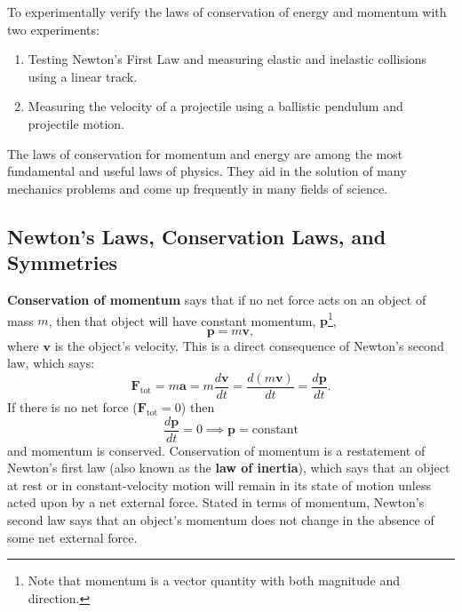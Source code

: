 \documentclass[addpoints]{physlabs}
\begin{document}
\begin{labsection}
\begin{objective}
    To experimentally verify the laws of conservation of energy and momentum with two experiments:
    \begin{enumerate}[itemsep=-0.1em]
        \item Testing Newton's First Law and measuring elastic and inelastic collisions using a linear track.
        \item Measuring the velocity of a projectile using a ballistic pendulum and projectile motion.
    \end{enumerate}
\end{objective}

\begin{theory}
    The laws of conservation for momentum and energy are among the most fundamental and useful laws of physics. 
    They aid in the solution of many mechanics problems and come up frequently in many fields of science.

    \subsection*{Newton's Laws, Conservation Laws, and Symmetries}
    
    \textbf{Conservation of momentum} says that if no net force acts on an object of mass $m$, then that object will have constant momentum, $\mathbf{p}$\footnote{Note that momentum is a vector quantity with both magnitude and direction.},
    \begin{equation}\label{eq: momentum}
        \mathbf{p} = m\mathbf{v},
    \end{equation}
    where $\mathbf{v}$ is the object's velocity.
    This is a direct consequence of Newton's second law, which says:
    \begin{equation}\label{eq:newton's second law}
        \mathbf{F}_\text{tot}
        =m\mathbf{a}
        =m\frac{d\mathbf{v}}{dt}
        =\frac{d(m\mathbf{v})}{dt}
        =\frac{d\mathbf{p}}{dt}.
    \end{equation}
    If there is no net force ($\mathbf{F}_\text{tot}=0$) then
    \begin{equation}
        \frac{d\mathbf{p}}{dt}=0 \implies \mathbf{p}=\text{constant}
    \end{equation}
    and momentum is conserved. Conservation of momentum is a restatement of Newton's first law (also known as the \textbf{law of inertia}), which says that an object at rest or in constant-velocity motion will remain in its state of motion unless acted upon by a net external force. Stated in terms of momentum, Newton's second law says that an object's momentum does not change in the absence of some net external force.
    

\end{theory}
\end{labsection}
\end{document}
